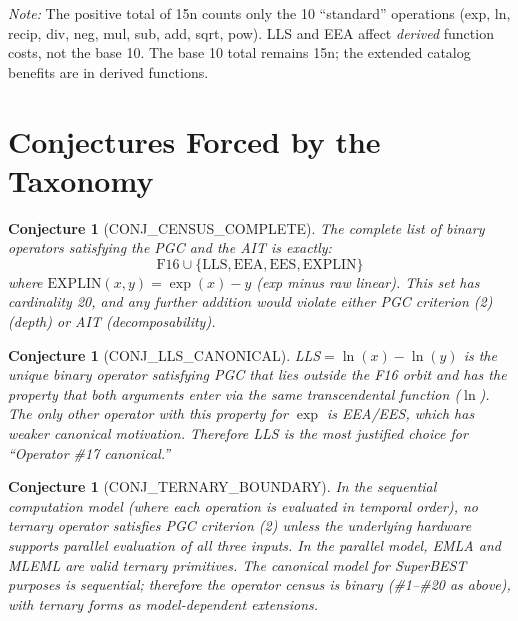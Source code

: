 \documentclass[11pt]{article}
\newtheorem{conjecture}[theorem]{Conjecture}
\begin{document}
\noindent \emph{Note:} The positive total of 15n counts only the 10 ``standard'' operations
(exp, ln, recip, div, neg, mul, sub, add, sqrt, pow). LLS and EEA affect \emph{derived}
function costs, not the base 10. The base 10 total remains 15n; the extended catalog
benefits are in derived functions.

\section{Conjectures Forced by the Taxonomy}
\label{sec:final-conjectures}

\begin{conjecture}[CONJ\_CENSUS\_COMPLETE]
The complete list of binary operators satisfying the PGC and the AIT is exactly:
\[
  \text{F16} \cup \{\mathrm{LLS}, \mathrm{EEA}, \mathrm{EES}, \mathrm{EXPLIN}\}
\]
where $\mathrm{EXPLIN}(x,y) = \exp(x) - y$ (exp minus raw linear).
This set has cardinality 20, and any further addition would violate either
PGC criterion (2) (depth) or AIT (decomposability).
\end{conjecture}

\begin{conjecture}[CONJ\_LLS\_CANONICAL]
LLS$= \ln(x) - \ln(y)$ is the unique binary operator satisfying PGC that lies
outside the F16 orbit and has the property that both arguments enter via the
\emph{same} transcendental function ($\ln$).
The only other operator with this property for $\exp$ is EEA/EES, which
has weaker canonical motivation.
Therefore LLS is the most justified choice for ``Operator \#17 canonical.''
\end{conjecture}

\begin{conjecture}[CONJ\_TERNARY\_BOUNDARY]
In the sequential computation model (where each operation is evaluated in
temporal order), no ternary operator satisfies PGC criterion (2) unless
the underlying hardware supports parallel evaluation of all three inputs.
In the parallel model, EMLA and MLEML are valid ternary primitives.
The canonical model for SuperBEST purposes is sequential; therefore
the operator census is binary (\#1--\#20 as above), with ternary forms
as model-dependent extensions.
\end{conjecture}

\end{document}
